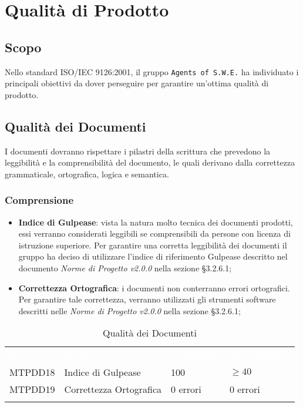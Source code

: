 \section{Qualità di Prodotto}
\label{qualitaProdotto}

\subsection{Scopo}

Nello standard ISO/IEC 9126:2001, il gruppo \texttt{Agents of S.W.E.} ha individuato i principali obiettivi da dover perseguire per garantire un'ottima qualità di prodotto.  

\subsection{Qualità dei Documenti}

I documenti dovranno rispettare i pilastri della scrittura che prevedono la leggibilità e la comprensibilità del documento, le quali derivano dalla correttezza grammaticale, ortografica, logica e semantica.

\subsubsection{Comprensione}

\begin{itemize}
	\item \textbf{Indice di Gulpease}: vista la natura molto tecnica dei documenti prodotti, essi verranno considerati leggibili se comprensibili da persone con licenza di istruzione superiore. Per garantire una corretta leggibilità dei documenti il gruppo ha deciso di utilizzare l'indice di riferimento Gulpease descritto nel documento \textit{Norme di Progetto v2.0.0} nella sezione §3.2.6.1;
	
	\item \textbf{Correttezza Ortografica}: i documenti non conterranno errori ortografici. Per garantire tale correttezza, verranno utilizzati gli strumenti software descritti nelle \textit{Norme di Progetto v2.0.0} nella sezione §3.2.6.1;
	
\end{itemize}

\begin{longtable}{|C{.15\textwidth}|C{.24\textwidth}|C{.24\textwidth}|C{.24\textwidth}|}
\hline
{}\textbf{\textcolor{white}{ID}} & \textbf{\textcolor{white}{Nome}} & \textbf{\textcolor{white}{Ottimalità}} & \textbf{\textcolor{white}{Accettabilità}}\\
MTPDD18 & Indice di Gulpease & 100 & $\geq 40$ \\
\hline
{}MTPDD19 & Correttezza Ortografica & 0 errori & 0 errori \\ 
\hline
\caption{Qualità dei Documenti}
\label{QualitàDocumenti}
\end{longtable}

